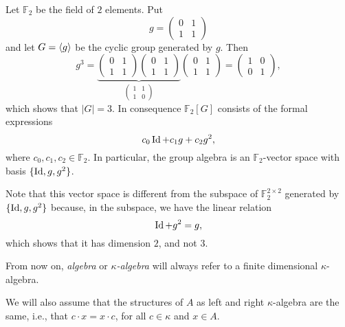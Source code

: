 \begin{xmpl}
    Let $\mathbb F_2$ be the field of $2$ elements. Put
    $$
        g = \begin{pmatrix}
            0   &1\\
            1   &1
        \end{pmatrix}
    $$
    and let $G=\langle g\rangle$ be the cyclic group generated by $g$. Then
    $$
        g^3 = \underbrace{\begin{pmatrix}
            0   &1\\
            1   &1
        \end{pmatrix}
        \begin{pmatrix}
            0   &1\\
            1   &1
        \end{pmatrix}}_{\begin{pmatrix}
            1   &1\\
            1   &0
        \end{pmatrix}}
        \begin{pmatrix}
            0   &1\\
            1   &1
        \end{pmatrix}
        = \begin{pmatrix}
            1   &0\\
            0   &1
        \end{pmatrix},
    $$
    which shows that $|G|=3$. In consequence $\mathbb F_2[G]$ consists of the formal expressions
    $$
        c_0\operatorname{Id} + c_1g + c_2g^2,
    $$
    where $c_0,c_1,c_2\in\mathbb F_2$. In particular, the group algebra is an $\mathbb F_2$-vector space with basis $\{\operatorname{Id},g,g^2\}$.

    Note that this vector space is different from the subspace of $\mathbb F_2^{2\times2}$ generated by $\{\operatorname{Id},g,g^2\}$ because, in the subspace, we have the linear relation
    $$
        \operatorname{Id} + g^2 = g,
    $$
    which shows that it has dimension $2$, and not $3$.
\end{xmpl}


\begin{ntn}
    From now on, \textsl{algebra} or \textsl{$\kappa$-algebra} will always refer to a finite dimensional\/ $\kappa$-algebra.

    We will also assume that the structures of\/ $A$ as left and right\/ $\kappa$-algebra are the same, i.e., that\/ $c\cdot x=x\cdot c$, for all\/ $c\in\kappa$ and\/ $x\in A$.
\end{ntn}


